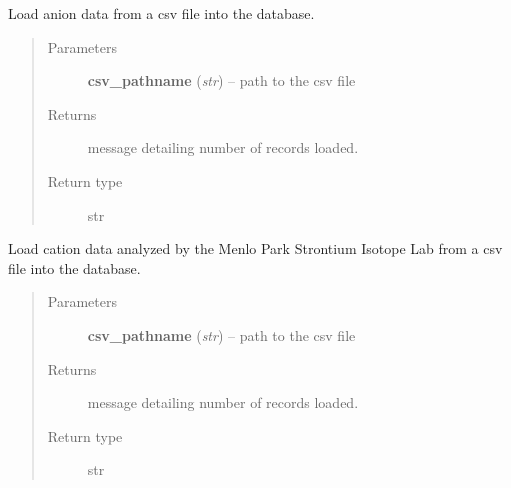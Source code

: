 \documentclass[letterpaper,10pt,english]{sphinxmanual}
\begin{document}
\begin{fulllineitems}
\begin{fulllineitems}
\end{fulllineitems}


\begin{fulllineitems}
\label{modules:webb_utils.upload_data.UploadData.load_anion_data}
Load anion data from a csv file into the database.
\begin{quote}\begin{description}
\item[{Parameters}] \leavevmode
\textbf{csv\_pathname} (\emph{str}) -- path to the csv file

\item[{Returns}] \leavevmode
message detailing number of records loaded.

\item[{Return type}] \leavevmode
str

\end{description}\end{quote}

\end{fulllineitems}


\begin{fulllineitems}
\label{modules:webb_utils.upload_data.UploadData.load_bullen_cation_data}
Load cation data analyzed by the Menlo Park Strontium
Isotope Lab from a csv file into the database.
\begin{quote}\begin{description}
\item[{Parameters}] \leavevmode
\textbf{csv\_pathname} (\emph{str}) -- path to the csv file

\item[{Returns}] \leavevmode
message detailing number of records loaded.

\item[{Return type}] \leavevmode
str

\end{description}\end{quote}

\end{fulllineitems}



\end{fulllineitems}
\end{document}
